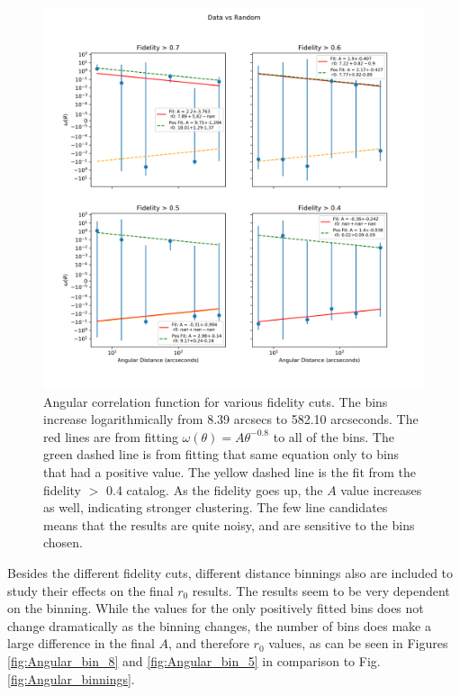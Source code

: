 \begin{figure}[tbp]
\centering \includegraphics[width=120mm]{clustering_two/Log_4Panel_Data_Vs_Random_bin6_NFalse_Num10000.png}
\caption{Angular correlation function for various fidelity cuts. The bins increase logarithmically from 8.39 arcsecs to 582.10 arcseconds. The red lines are from fitting $\omega(\theta) = A\theta^{-0.8} $ to all of the bins. The green dashed line is from fitting that same equation only to bins that had a positive value. The yellow dashed line is the fit from the fidelity $>$ 0.4 catalog. As the fidelity goes up, the $A$ value increases as well, indicating stronger clustering. The few line candidates means that the results are quite noisy, and are sensitive to the bins chosen.}
\label{fig:Angular_correlation}
\end{figure}

Besides the different fidelity cuts, different distance binnings also are included to study their effects on the final $r_0$ results. The results seem to be very dependent on the binning. While the values for the only positively fitted bins does not change dramatically as the binning changes, the number of bins does make a large difference in the final $A$, and therefore $r_0$ values, as can be seen in Figures \ref{fig:Angular_bin_8} and \ref{fig:Angular_bin_5} in comparison to Fig. \ref{fig:Angular_binnings}.

